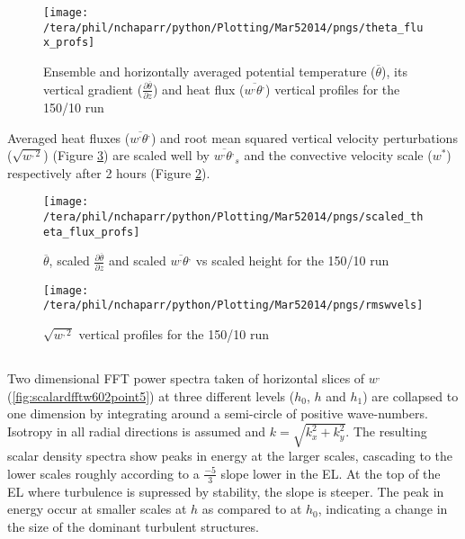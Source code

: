 \begin{figure}[htbp]
    \centering
    \texttt{[image: /tera/phil/nchaparr/python/Plotting/Mar52014/pngs/theta\_flux\_profs]}
    \caption{Ensemble and horizontally averaged potential temperature ($\overline{\theta}$), its vertical gradient ($\frac{\partial \overline{\theta}}{\partial z}$)  and heat flux ($\overline{w^{,}\theta^{,}}$) vertical profiles for the 150/10 run}
    \label{fig:tempgradfluxprofs15010}   %
\end{figure}

Averaged heat fluxes ($\overline{w^{,}\theta^{,}}$) and root mean squared vertical velocity perturbations ($\sqrt{w^{,2}}$) (Figure \ref{fig:rmswvelprofs15010}) are scaled 
well by $\overline{w^{,}\theta^{,}}_{s}$ and the convective velocity scale ($w^{*}$) respectively after 2 hours 
(Figure \ref{fig:scaledtempgradfluxprofs15010}).\\


\begin{figure}[htbp]
    \centering
    \texttt{[image: /tera/phil/nchaparr/python/Plotting/Mar52014/pngs/scaled\_theta\_flux\_profs]}
    \caption{$\overline{\theta}$, scaled $\frac{\partial \overline{\theta}}{\partial z}$ and scaled $\overline{w^{,}\theta^{,}}$  vs scaled height for the 150/10 run}
    \label{fig:scaledtempgradfluxprofs15010}   %
\end{figure}

\begin{figure}[htbp]
    \centering
    \texttt{[image: /tera/phil/nchaparr/python/Plotting/Mar52014/pngs/rmswvels]}
    \caption{$\sqrt{w^{,2}}$ vertical profiles for the 150/10 run}
    \label{fig:rmswvelprofs15010}   %
\end{figure}

\clearpage
\subsection{}
\FloatBarrier

Two dimensional \acs{FFT} power spectra taken of horizontal slices of $w^{,}$ (\ref{fig:scalardfftw602point5}) at three
different levels ($h_{0}$, $h$ and $h_{1}$) are collapsed to one dimension by integrating around a semi-circle of positive wave-numbers.
Isotropy in all radial directions is assumed and $k = \sqrt{k_{x}^{2} + k_{y}^{2}}$.  The resulting scalar density spectra show peaks in 
energy at the larger scales, cascading to the lower scales roughly according to a $\frac{-5}{3}$ slope lower in the \acs{EL}.  At
the top of the \acs{EL} where turbulence is supressed by stability, the slope is steeper.  The peak in energy occur at smaller scales
at $h$ as compared to at $h_{0}$, indicating a change in the size of the dominant turbulent structures.\\

